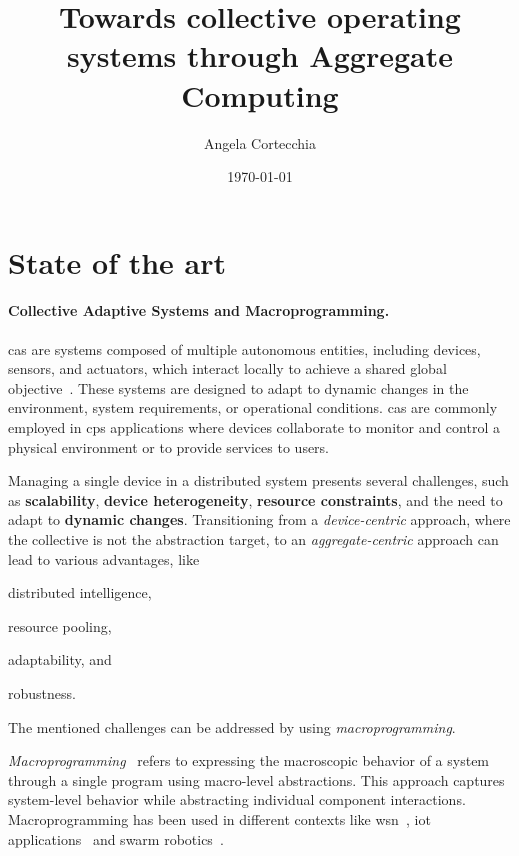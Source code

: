 \documentclass[12pt, a4paper]{article}
\newenvironment{inlinelist}{\begin{enumerate*}[label=\emph{(\roman*)}]}{\end{enumerate*}}
\begin{document}
\title{Towards collective operating systems through Aggregate Computing}
\author{Angela Cortecchia}
\date{\today}
\maketitle
%

\section{State of the art}
\label{sec:state-of-the-art}

\sloppypar
\paragraph{Collective Adaptive Systems and Macroprogramming.}
\ac{cas} are systems composed of multiple autonomous entities,
including devices, sensors, and actuators, which interact locally to achieve a shared global objective~\cite{ferscha2015}.
%
These systems are designed to adapt to dynamic changes in the environment, system requirements, or operational conditions.
%
\ac{cas} are commonly employed in \ac{cps} applications where devices collaborate to monitor and control a
physical environment or to provide services to users.

Managing a single device in a distributed system presents several challenges,
such as \textbf{scalability}, \textbf{device heterogeneity},
\textbf{resource constraints}, and the need to adapt to \textbf{dynamic changes}.
%
Transitioning from a \emph{device-centric} approach,
where the collective is not the abstraction target,
to an \emph{aggregate-centric} approach can lead to various advantages, like
\begin{inlinelist}
    \item distributed intelligence,
    \item resource pooling,
    \item adaptability, and
    \item robustness.
\end{inlinelist}
%
The mentioned challenges can be addressed by using \emph{macroprogramming}.

\emph{Macroprogramming}~\cite{casadei2023} refers
to expressing the macroscopic behavior of a system through a single program using
macro-level abstractions.
%
This approach captures system-level behavior while abstracting individual component interactions.
%
Macroprogramming has been used in different contexts like \ac{wsn}~\cite{1440891}, \ac{iot} applications~\cite{noor19,mizzi18} and swarm robotics~\cite{buzz}.
\end{document}
